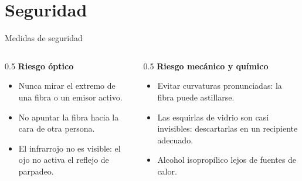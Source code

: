 \documentclass[aspectratio=1610]{beamer}
\begin{document}
\section[Seguridad]{Seguridad}
\begin{frame}{Medidas de seguridad}
  \begin{columns}[T]
    \begin{column}{0.5\textwidth}
      \textbf{Riesgo óptico}
      \begin{itemize}
        \item Nunca mirar el extremo de una fibra o un emisor activo.
        \item No apuntar la fibra hacia la cara de otra persona.
        \item El infrarrojo no es visible: el ojo no activa el reflejo de parpadeo.
      \end{itemize}
    \end{column}
    \begin{column}{0.5\textwidth}
      \textbf{Riesgo mecánico y químico}
      \begin{itemize}
        \item Evitar curvaturas pronunciadas: la fibra puede astillarse.
        \item Las esquirlas de vidrio son casi invisibles: descartarlas en un recipiente adecuado.
        \item Alcohol isopropílico lejos de fuentes de calor.
      \end{itemize}
    \end{column}
  \end{columns}
\end{frame}

\end{document}
